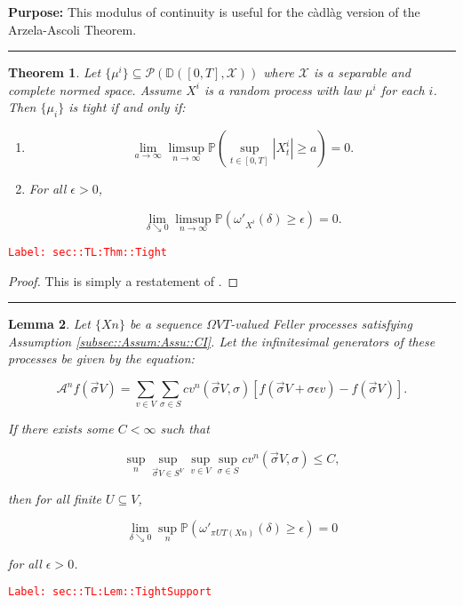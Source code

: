 \documentclass[12pt]{article}
\newcommand{\mb}{\mathbb}
\newcommand{\mc}{\mathcal}
\newcommand{\ra}{\rightarrow}
\newcommand{\ep}{\epsilon}
\newcommand{\tr}{\textcolor{red}}
\newcommand{\labe}[1]{\tr{\texttt{Label: #1}}}
\newcommand{\purpose}{\textbf{Purpose: }}
\newcommand{\lin}{\rule{\linewidth}{0.4 pt}}
\newcommand{\pr}{\mb{P}}							%
\newcommand{\cad}{\mb{D}}							%
\renewcommand{\v}{v}							%
\renewcommand{\U}{U}							%
\renewcommand{\S}{S}							%
\newcommand{\s}{\sigma}							%
\newcommand{\sv}{\vec{\s}}						%
\newcommand{\ev}{\ep}							%
\newcommand{\T}{T}								%
\newcommand{\proj}{\pi}							%
\newcommand{\X}{X}								%
\newcommand{\IG}{\mc{A}}						%
\newcommand{\IGr}{c}							%
\newcommand{\const}{C}							%
\newcommand{\sln}[1]{^{#1}}						%
\newtheorem{thms}{Theorem}[section]
\newtheorem{lem}[thms]{Lemma}
\begin{document}
\purpose This modulus of continuity is useful for the c\`adl\`ag version of the Arzela-Ascoli Theorem.

\lin

\begin{thms}
Let \(\{\mu^i\}\subseteq \mc{P}\left(\cad([0,T],\mc{X})\right)\) where \(\mc{X}\) is a separable and complete normed space. Assume \(X^i\) is a random process with law \(\mu^i\) for each \(i\). Then \(\{\mu_i\}\) is tight if and only if:

\begin{enumerate}[(1)]
\item 

\[\lim_{a \ra \infty}\limsup_{n \ra\infty} \pr\left(\sup_{t \in [0,T]} |X^i_t| \geq a\right) = 0.\]

\item For all \(\ep > 0\),

\[\lim_{\delta \searrow 0}\limsup_{n\ra\infty} \pr\left(\omega'_{X^i}(\delta) \geq \ep\right) = 0.\]
\end{enumerate}
\label{sec::TL:Thm::Tight}
\end{thms}
\labe{sec::TL:Thm::Tight}

\begin{proof}
This is simply a restatement of \cite[Theorem 13.2]{Bil99}.
\end{proof}

\lin

\begin{lem}
Let \(\{\X{}{}{n}\}\) be a sequence \(\Omega{ V}{\T}\)-valued Feller processes satisfying Assumption \ref{subsec::Assum:Assu::CI}. Let the infinitesimal generators of these processes be given by the equation:

\[\IG\sln{n}f(\sv{}{ V}) = \sum_{\v\in  V}\sum_{\s \in \S} \IGr{\v}\sln{n}(\sv{}{ V},\s)[f(\sv{}{ V} + \s\ev{\v}) - f(\sv{}{ V})].\]

If there exists some \(\const{} < \infty\) such that

\[\sup_{n}\sup_{\sv{}{ V}\in \S^ V}\sup_{\v\in V}\sup_{\s\in \S} \IGr{\v}\sln{n}(\sv{}{ V},\s) \leq \const{},\]

then for all finite \(\U \subseteq  V\),

\[\lim_{\delta \searrow 0} \sup_n \pr\left(\omega'_{\proj{\U}{\T}\left(\X{}{}{n}\right)}(\delta) \geq \ep\right) = 0\]

for all \(\ep > 0\).
\label{sec::TL:Lem::TightSupport}
\end{lem}
\labe{sec::TL:Lem::TightSupport}
\end{document}
